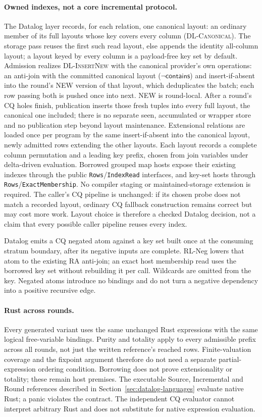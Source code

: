\paragraph{Owned indexes, not a core incremental protocol.}
The Datalog layer records, for each relation, one canonical layout: an
ordinary member of its full layouts whose key covers every column
(\textsc{DL-Canonical}). The storage pass reuses the first such read layout,
else appends the identity all-column layout; a layout keyed by every column is
a payload-free key set by default. Admission realizes \textsc{DL-InsertNew}
with the canonical provider's own operations: an anti-join with the committed
canonical layout ($\neg\mathsf{contains}$) and insert-if-absent into the
round's NEW version of that layout, which deduplicates the batch; each row
passing both is pushed once into next. NEW is round-local. After a round's
CQ holes finish, publication inserts those fresh tuples into every full
layout, the canonical one included; there is no separate seen, accumulated or
wrapper store and no publication step beyond layout maintenance. Extensional
relations are loaded once per program by the same insert-if-absent into the
canonical layout, newly admitted rows extending the other layouts.
Each layout records a
complete column permutation and a leading key prefix, chosen from join
variables under delta-driven evaluation. Borrowed grouped map hosts expose
their existing indexes through the public \texttt{Rows}/\texttt{IndexRead}
interfaces, and key-set hosts through \texttt{Rows}/\texttt{ExactMembership}.
No compiler staging or maintained-storage extension is required.
The caller's CQ pipeline is unchanged: if its chosen probe does not match a
recorded layout, ordinary CQ fallback construction remains correct but may
cost more work. Layout choice is therefore a checked Datalog decision, not a
claim that every possible caller pipeline reuses every index.

Datalog emits a CQ negated atom against a key set built once at the consuming
stratum boundary, after its negative inputs are complete. RL-Neg lowers that
atom to the existing RA anti-join; an exact host membership read uses the
borrowed key set without rebuilding it per call. Wildcards are omitted from
the key. Negated atoms introduce no bindings and do not turn a negative
dependency into a positive recursive edge.

\paragraph{Rust across rounds.}
Every generated variant uses the same unchanged Rust expressions with the
same logical free-variable bindings. Purity and totality apply to every
admissible prefix across all rounds, not just the written reference's reached
rows. Finite-valuation coverage and the fixpoint argument therefore do not
need a separate partial-expression ordering condition. Borrowing does not
prove extensionality or totality; these remain host premises.
The executable Source, Incremental and Round references described in
Section~\ref{sec:datalog-languages} evaluate native Rust; a panic violates
the contract. The independent CQ evaluator cannot interpret arbitrary Rust
and does not substitute for native expression evaluation.

